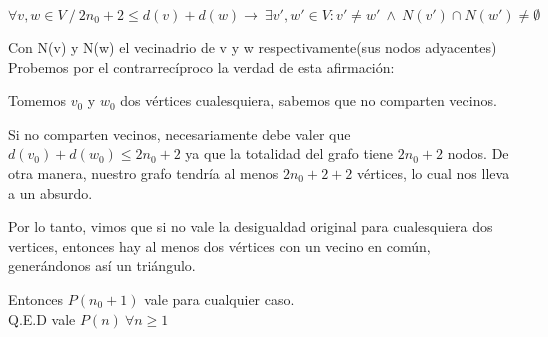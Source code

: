 \documentclass{article}
\begin{document}
\[
 \forall v,w \in V \ / \ 2n_0 + 2 \leq d(v) + d(w)  \rightarrow  \ \exists v',w' \in V :   v' \neq  w' \ \land \  N(v') \cap N(w') \neq \emptyset
\]

Con N(v) y N(w) el vecinadrio de v y w respectivamente(sus nodos adyacentes)\\
Probemos por el contrarrecíproco la verdad de esta afirmación:

Tomemos \( v_0 \) y \( w_0 \) dos vértices cualesquiera, sabemos que no comparten vecinos.

Si no comparten vecinos, necesariamente debe valer que \( d(v_0) + d(w_0) \leq 2n_0 + 2 \) ya que la totalidad del grafo tiene \( 2n_0 + 2 \) nodos. De otra manera, nuestro grafo tendría al menos \( 2n_0 + 2 + 2 \) vértices, lo cual nos lleva a un absurdo.

Por lo tanto, vimos que si no vale la desigualdad original para cualesquiera dos vertices, entonces hay al menos dos vértices con un vecino en común, generándonos así un triángulo. 

Entonces \( P(n_0 + 1) \) vale para cualquier caso.\\

Q.E.D vale \( P(n) \ \forall n \geq 1 \)
\end{document}
